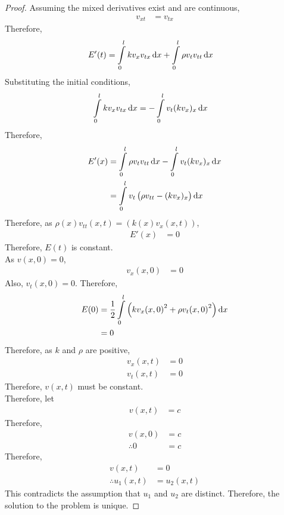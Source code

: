 \documentclass[titlepage, fleqn, a4paper, 12pt, twoside]{article}
\theoremstyle{definition}
\theoremstyle{theorem}
\begin{document}
\begin{proof}
	Assuming the mixed derivatives exist and are continuous,
	\begin{align*}
		v_{x t} & = v_{t x}
	\end{align*}
	Therefore,
	\begin{align*}
		E'(t) & = \int\limits_{0}^{l} k v_x v_{t x} \dif x + \int\limits_{0}^{l} \rho v_t v_{t t} \dif x
	\end{align*}
	Substituting the initial conditions,
	\begin{align*}
		\int\limits_{0}^{l} k v_x v_{t x} \dif x & = -\int\limits_{0}^{l} v_t(k v_x)_x \dif x
	\end{align*}
	Therefore,
	\begin{align*}
		E'(x) & = \int\limits_{0}^{l} \rho v_t v_{t t} \dif x - \int\limits_{0}^{l} v_t (k v_x)_x \dif x \\
                      & = \int\limits_{0}^{l} v_t \left( \rho v_{t t} - (k v_x)_x \right) \dif x
	\end{align*}
	Therefore, as $\rho(x) v_{t t}(x,t) = \left( k(x) v_x(x,t) \right)$,
	\begin{align*}
		E'(x) & = 0
	\end{align*}
	Therefore, $E(t)$ is constant.\\
	As $v(x,0) = 0$,
	\begin{align*}
		v_x(x,0) & = 0
	\end{align*}
	Also, $v_t(x,0) = 0$.
	Therefore,
	\begin{align*}
		E(0) & = \frac{1}{2} \int\limits_{0}^{l} \left( k {v_x(x,0)}^2 + \rho {v_t(x,0)}^2 \right) \dif x \\
                     & = 0
	\end{align*}
	Therefore, as $k$ and $\rho$ are positive,
	\begin{align*}
		v_x(x,t) & = 0 \\
		v_t(x,t) & = 0
	\end{align*}
	Therefore, $v(x,t)$ must be constant.\\
	Therefore, let
	\begin{align*}
		v(x,t) & = c
	\end{align*}
	Therefore,
	\begin{align*}
		v(x,0)       & = c \\
		\therefore 0 & = c
	\end{align*}
	Therefore,
	\begin{align*}
		v(x,t)              & = 0 \\
		\therefore u_1(x,t) & = u_2(x,t)
	\end{align*}
	This contradicts the assumption that $u_1$ and $u_2$ are distinct.
	Therefore, the solution to the problem is unique.
\end{proof}
\end{document}
